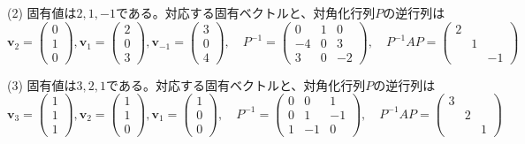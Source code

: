 \noindent (2) 固有値は$2, 1, -1$である。対応する固有ベクトルと、対角化行列$P$の逆行列は
\[
\bm{v}_{2} = 
\begin{pmatrix}
0 \\
1 \\
0
\end{pmatrix}, 
\bm{v}_{1} = 
\begin{pmatrix}
2 \\
0 \\
3
\end{pmatrix}, 
\bm{v}_{-1} = 
\begin{pmatrix}
3 \\
0 \\
4
\end{pmatrix}, \quad
P^{-1} = 
\begin{pmatrix}
0 & 1 & 0 \\
-4 & 0 & 3 \\
3 & 0 & -2
\end{pmatrix}, \quad
P^{-1} AP =
\begin{pmatrix}
2 \\
 & 1 \\
 & & -1
\end{pmatrix}
\]

\noindent (3) 固有値は$3, 2, 1$である。対応する固有ベクトルと、対角化行列$P$の逆行列は
\[
\bm{v}_{3} = 
\begin{pmatrix}
1 \\
1 \\
1
\end{pmatrix}, 
\bm{v}_{2} = 
\begin{pmatrix}
1 \\
1 \\
0
\end{pmatrix}, 
\bm{v}_{1} = 
\begin{pmatrix}
1 \\
0 \\
0
\end{pmatrix}, \quad
P^{-1} = 
\begin{pmatrix}
0 & 0 & 1 \\
0 & 1 & -1 \\
1 & -1 & 0
\end{pmatrix}, \quad
P^{-1} AP =
\begin{pmatrix}
3 \\
 & 2 \\
 & & 1
\end{pmatrix}
\]

